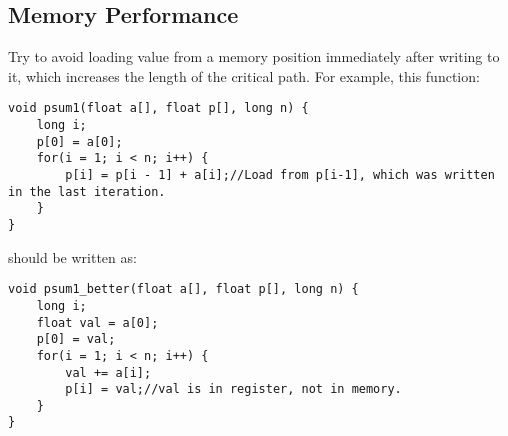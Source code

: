 \subsection{Memory Performance}
Try to avoid loading value from a memory position immediately after writing to it, which increases the length of the critical path. For example, this function:
\begin{lstlisting}
void psum1(float a[], float p[], long n) {
	long i;
	p[0] = a[0];
	for(i = 1; i < n; i++) {
		p[i] = p[i - 1] + a[i];//Load from p[i-1], which was written in the last iteration. 
	}
}
\end{lstlisting}
should be written as:
\begin{lstlisting}
void psum1_better(float a[], float p[], long n) {
	long i;
	float val = a[0];
	p[0] = val;
	for(i = 1; i < n; i++) {
		val += a[i];
		p[i] = val;//val is in register, not in memory.
	}
}
\end{lstlisting}
\ifx\PREAMBLE\undefined

\fi